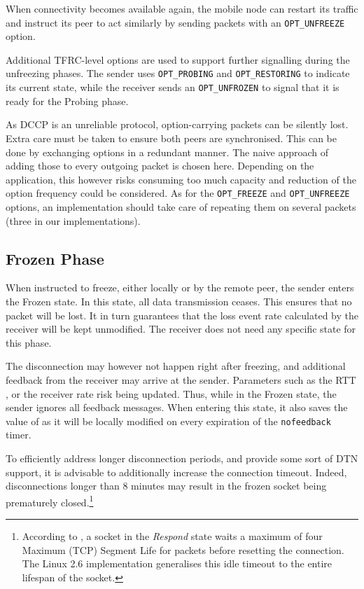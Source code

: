 \documentclass[twocolumn]{nictatechreport}
\begin{document}
When connectivity becomes available again, the mobile node can restart its
traffic and instruct its peer to act similarly by sending packets with
an \verb#OPT_UNFREEZE# option.

Additional TFRC-level options are used to support further signalling during the
unfreezing phases. The sender uses \verb#OPT_PROBING# and \verb#OPT_RESTORING#
to indicate its current state, while the receiver sends an \verb#OPT_UNFROZEN#
to signal that it is ready for the Probing phase.

As DCCP is an unreliable protocol, option-carrying packets can be silently
lost. Extra care must be taken to ensure both peers are synchronised. This can
be done by exchanging options in a redundant manner. The naive approach of
adding those to every outgoing packet is chosen here. Depending on the
application, this however risks consuming too much capacity and reduction of the
option frequency could be considered. As for the \verb#OPT_FREEZE# and
\verb#OPT_UNFREEZE# options, an implementation should take care of repeating
them on several packets (three in our implementations).

\subsection{Frozen Phase}

When instructed to freeze, either locally or by the remote peer, the sender
enters the Frozen state. In this state, all data transmission ceases. This
ensures that no packet will be lost. It in turn guarantees that the loss event
rate calculated by the receiver will be kept unmodified. The receiver does not
need any specific state for this phase.

The disconnection may however not happen right after freezing, and additional
feedback from the receiver may arrive at the sender. Parameters such as the
RTT , or the receiver rate  risk being updated. Thus,
while in the Frozen state, the sender ignores all feedback messages. When
entering this state, it also saves the value of  as it will be
locally modified on every expiration of the \verb#nofeedback# timer.

To efficiently address longer disconnection periods, and provide some sort of
DTN support, it is advisable to additionally increase the connection timeout.
Indeed, disconnections longer than 8 minutes may result in the frozen socket
being prematurely closed.\footnote{According to \cite{rfc4340}, a socket in the
\emph{Respond} state waits a maximum of four Maximum (TCP) Segment Life for
packets before resetting the connection. The Linux 2.6 implementation
generalises this idle timeout to the entire lifespan of the socket.}
\end{document}
